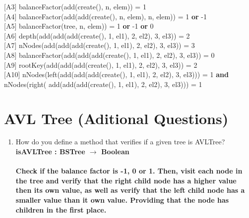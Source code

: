 \documentclass[12pt]{article}
\begin{document}
\begin{spacing}{1.5}
\hspace*{5mm} [A3]  balanceFactor(add(create(), n, elem)) = 1\\
\hspace*{5mm} [A4]  balanceFactor(add(add(create(), n, elem), n, elem)) = 1 \textbf{or} -1\\
\hspace*{5mm} [A5]  balanceFactor(tree, n, elem)) = 1 \textbf{or} -1 \textbf{or} 0\\
\hspace*{5mm} [A6]  depth(add(add(add(create(), 1, el1), 2, el2), 3, el3)) = 2\\
\hspace*{5mm} [A7] nNodes(add(add(add(create(), 1, el1), 2, el2), 3, el3)) = 3\\
\hspace*{5mm} [A8] balanceFactor(add(add(add(create(), 1, el1), 2, el2), 3, el3)) = 0 \\
\hspace*{5mm} [A9] rootKey(add(add(add(create(), 1, el1), 2, el2), 3, el3)) = 2\\
\hspace*{5mm} [A10] nNodes(left(add(add(add(create(), 1, el1), 2, el2), 3, el3))) = 1 \textbf{and}  nNodes(right( add(add(add(create(), 1, el1), 2, el2), 3, el3))) = 1\\


\section*{AVL Tree (Aditional Questions)}

\begin{enumerate}

\item How do you define a method that verifies if a given tree is AVLTree?\\
\textbf{isAVLTree : BSTree $\rightarrow$ Boolean} \\ \\
\textbf{Check if the balance factor is -1, 0 or 1. Then, visit each node in the tree and verify that the right child node has a higher value then its own value, as well as verify that the left child node has a smaller value than it own value. Providing that the node has children in the first place.}
  



\end{enumerate}
\end{spacing}
\end{document}
